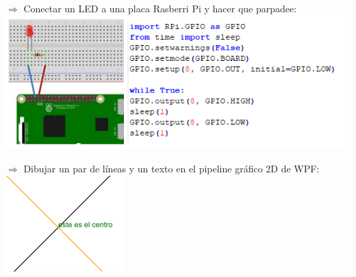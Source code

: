 \documentclass[spanish,12pt,a4paper,final,oneside]{book}
\begin{document}
$\Rightarrow$ Conectar un LED a una placa Rasberri Pi y hacer que parpadee:
\\
\includegraphics[width=\textwidth]{Conectar un led a una RaspberriPi}   


$\Rightarrow$ Dibujar un par de líneas y un texto en el pipeline gráfico 2D de WPF:
\\ \includegraphics{Dibujar en el pipeline 2D de WPF}   
\end{document}
